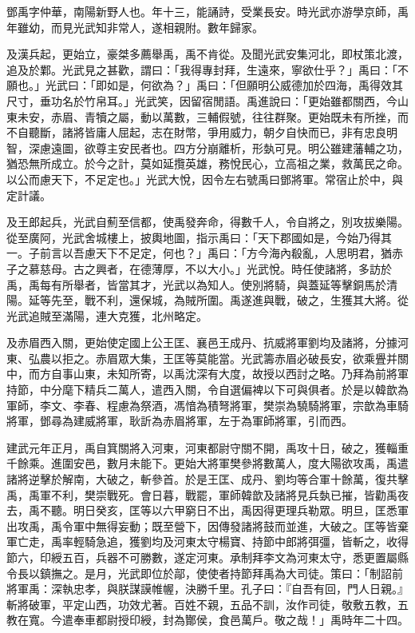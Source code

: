 
\begin{pinyinscope}
鄧禹字仲華，南陽新野人也。年十三，能誦詩，受業長安。時光武亦游學京師，禹年雖幼，而見光武知非常人，遂相親附。數年歸家。

及漢兵起，更始立，豪桀多薦舉禹，禹不肯從。及聞光武安集河北，即杖策北渡，追及於鄴。光武見之甚歡，謂曰：「我得專封拜，生遠來，寧欲仕乎？」禹曰：「不願也。」光武曰：「即如是，何欲為？」禹曰：「但願明公威德加於四海，禹得效其尺寸，垂功名於竹帛耳。」光武笑，因留宿閒語。禹進說曰：「更始雖都關西，今山東未安，赤眉、青犢之屬，動以萬數，三輔假號，往往群聚。更始既未有所挫，而不自聽斷，諸將皆庸人屈起，志在財幣，爭用威力，朝夕自快而已，非有忠良明智，深慮遠圖，欲尊主安民者也。四方分崩離析，形埶可見。明公雖建藩輔之功，猶恐無所成立。於今之計，莫如延攬英雄，務悅民心，立高祖之業，救萬民之命。以公而慮天下，不足定也。」光武大悅，因令左右號禹曰鄧將軍。常宿止於中，與定計議。

及王郎起兵，光武自薊至信都，使禹發奔命，得數千人，令自將之，別攻拔樂陽。從至廣阿，光武舍城樓上，披輿地圖，指示禹曰：「天下郡國如是，今始乃得其一。子前言以吾慮天下不足定，何也？」禹曰：「方今海內殽亂，人思明君，猶赤子之慕慈母。古之興者，在德薄厚，不以大小。」光武悅。時任使諸將，多訪於禹，禹每有所舉者，皆當其才，光武以為知人。使別將騎，與蓋延等擊銅馬於清陽。延等先至，戰不利，還保城，為賊所圍。禹遂進與戰，破之，生獲其大將。從光武追賊至滿陽，連大克獲，北州略定。

及赤眉西入關，更始使定國上公王匡、襄邑王成丹、抗威將軍劉均及諸將，分據河東、弘農以拒之。赤眉眾大集，王匡等莫能當。光武籌赤眉必破長安，欲乘舋并關中，而方自事山東，未知所寄，以禹沈深有大度，故授以西討之略。乃拜為前將軍持節，中分麾下精兵二萬人，遣西入關，令自選偏裨以下可與俱者。於是以韓歆為軍師，李文、李春、程慮為祭酒，馮愔為積弩將軍，樊崇為驍騎將軍，宗歆為車騎將軍，鄧尋為建威將軍，耿訢為赤眉將軍，左于為軍師將軍，引而西。

建武元年正月，禹自箕關將入河東，河東都尉守關不開，禹攻十日，破之，獲輜重千餘乘。進圍安邑，數月未能下。更始大將軍樊參將數萬人，度大陽欲攻禹，禹遣諸將逆擊於解南，大破之，斬參首。於是王匡、成丹、劉均等合軍十餘萬，復共擊禹，禹軍不利，樊崇戰死。會日暮，戰罷，軍師韓歆及諸將見兵埶已摧，皆勸禹夜去，禹不聽。明日癸亥，匡等以六甲窮日不出，禹因得更理兵勒眾。明旦，匡悉軍出攻禹，禹令軍中無得妄動；既至營下，因傳發諸將鼓而並進，大破之。匡等皆棄軍亡走，禹率輕騎急追，獲劉均及河東太守楊寶、持節中郎將弭彊，皆斬之，收得節六，印綬五百，兵器不可勝數，遂定河東。承制拜李文為河東太守，悉更置屬縣令長以鎮撫之。是月，光武即位於鄗，使使者持節拜禹為大司徒。策曰：「制詔前將軍禹：深執忠孝，與朕謀謨帷幄，決勝千里。孔子曰：『自吾有回，門人日親。』斬將破軍，平定山西，功效尤著。百姓不親，五品不訓，汝作司徒，敬敷五教，五教在寬。今遣奉車都尉授印綬，封為酇侯，食邑萬戶。敬之哉！」禹時年二十四。


\end{pinyinscope}
